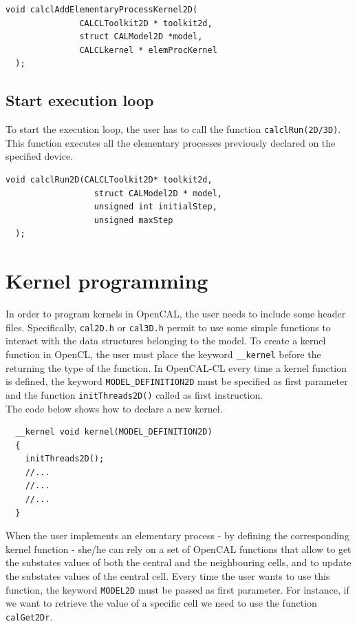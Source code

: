 \begin{lstlisting}[numbers=none]
  void calclAddElementaryProcessKernel2D(
               CALCLToolkit2D * toolkit2d,
               struct CALModel2D *model,
               CALCLkernel * elemProcKernel
  );
\end{lstlisting}


\subsection{Start execution loop}

To start the execution loop, the user has to call the function
\verb'calclRun(2D/3D)'. This function executes all the elementary
processes previously declared on the specified device.

\begin{lstlisting}[numbers=none]
  void calclRun2D(CALCLToolkit2D* toolkit2d,
                  struct CALModel2D * model,
                  unsigned int initialStep,
                  unsigned maxStep
  );
\end{lstlisting}


\section{Kernel programming}

In order to program kernels in OpenCAL, the user needs to include some
header files. Specifically, \verb'cal2D.h' or \verb'cal3D.h' permit
to use some simple functions to interact with the data structures
belonging to the model. To create a kernel function in OpenCL, the user
must place the keyword \verb'__kernel' before the returning the type
of the function. In OpenCAL-CL every time a kernel function is defined, the
keyword \verb'MODEL_DEFINITION2D' must be specified as first parameter
and the function \verb'initThreads2D()' called as first
instruction.\\ The code below shows how to declare a new kernel.

\begin{lstlisting} 
  __kernel void kernel(MODEL_DEFINITION2D)
  {
    initThreads2D();
    //...
    //...
    //...
  }
\end{lstlisting}

When the user implements an elementary process - by defining
the corresponding kernel function - she/he can rely on a set of OpenCAL functions
that allow to get the substates values of both the central and the
neighbouring cells, and to update the substates values of the central
cell. Every time the user wants to use this function, the keyword \verb'MODEL2D' must be passed
as first parameter. For instance, if we
want to retrieve the value of a specific cell we need to use the function
\verb'calGet2Dr'.

